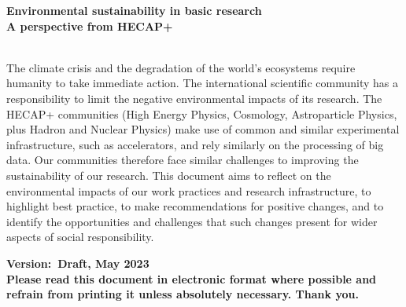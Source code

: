 \documentclass[../SustainableHEP.tex]{subfiles}
\begin{document}
\RaggedRight
\sloppy
\begin{titlepage}

    \doublespacing    
    \begin{flushleft}
    \textbf{\huge Environmental sustainability in basic research}\\
    \textbf{\Large A perspective from HECAP+}
    \end{flushleft}
    \singlespacing

    \vspace{27em}

    \\

    \noindent The climate crisis and the degradation of the world's ecosystems require humanity to take immediate action. The international scientific community has a responsibility to limit the negative environmental impacts of its research. The HECAP+ communities (High Energy Physics, Cosmology, Astroparticle Physics, plus Hadron and Nuclear Physics) make use of common and similar experimental infrastructure, such as accelerators, and rely similarly on the processing of big data. Our communities therefore face similar challenges to improving the sustainability of our research. This document aims to reflect on the environmental impacts of our work practices and research infrastructure, to highlight best practice, to make recommendations for positive changes, and to identify the opportunities and challenges that such changes present for wider aspects of social responsibility.\\
           
    \begin{flushright}
        \textbf{Version:\ Draft, May 2023}\\
        \textbf{\textcolor{Pythongreen}{Please read this document in electronic format where possible and refrain from printing it unless absolutely necessary. Thank you.}}
    \end{flushright}

\end{titlepage}

\newpage

\thispagestyle{empty}

~

\vspace{23em}
\RaggedRight
\end{document}
